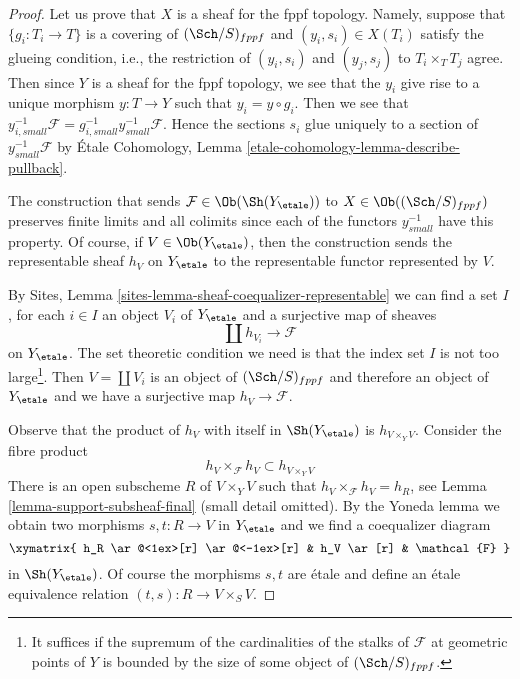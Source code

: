 \begin{proof}
Let us prove that $X$ is a sheaf for the fppf topology. Namely, suppose
that $\{g_i : T_i \to T\}$ is a covering of $(\Sch/S)_{fppf}$ and
$(y_i, s_i) \in X(T_i)$ satisfy the glueing condition, i.e., the
restriction of $(y_i, s_i)$ and $(y_j, s_j)$ to $T_i \times_T T_j$ agree.
Then since $Y$ is a sheaf for the fppf topology, we see that
the $y_i$ give rise to a unique morphism $y : T \to Y$ such that
$y_i = y \circ g_i$. Then we see that
$y_{i, small}^{-1}\mathcal{F} = g_{i, small}^{-1}y_{small}^{-1}\mathcal{F}$.
Hence the sections $s_i$ glue uniquely to a section of
$y_{small}^{-1}\mathcal{F}$ by
\'Etale Cohomology, Lemma \ref{etale-cohomology-lemma-describe-pullback}.

\medskip\noindent
The construction that sends $\mathcal{F} \in \Ob(\Sh(Y_\etale))$
to $X \in \Ob((\Sch/S)_{fppf})$ preserves finite limits and
all colimits since each of the functors $y_{small}^{-1}$ have
this property. Of course, if $V \in \Ob(Y_\etale)$, then
the construction sends the representable sheaf $h_V$ on $Y_\etale$
to the representable functor represented by $V$.

\medskip\noindent
By Sites, Lemma \ref{sites-lemma-sheaf-coequalizer-representable}
we can find a set $I$, for each $i \in I$ an object $V_i$ of $Y_\etale$
and a surjective map of sheaves
$$
\coprod h_{V_i} \longrightarrow \mathcal{F}
$$
on $Y_\etale$. The set theoretic condition we need is that the index
set $I$ is not too large\footnote{It suffices if the supremum of the
cardinalities of the stalks of $\mathcal{F}$ at geometric points of $Y$
is bounded by the size of some object of $(\Sch/S)_{fppf}$.}.
Then $V = \coprod V_i$ is an object of $(\Sch/S)_{fppf}$ and
therefore an object of $Y_\etale$ and we have a surjective map
$h_V \to \mathcal{F}$.

\medskip\noindent
Observe that the product of $h_V$ with itself in $\Sh(Y_\etale)$
is $h_{V \times_Y V}$. Consider the fibre product
$$
h_V \times_\mathcal{F} h_V \subset h_{V \times_Y V}
$$
There is an open subscheme $R$ of $V \times_Y V$ such that
$h_V \times_\mathcal{F} h_V = h_R$, see
Lemma \ref{lemma-support-subsheaf-final} (small detail omitted).
By the Yoneda lemma we obtain two morphisms $s, t : R \to V$ in $Y_\etale$
and we find a coequalizer diagram
$$
\xymatrix{
h_R \ar@<1ex>[r] \ar@<-1ex>[r] &
h_V \ar[r] &
\mathcal{F}
}
$$
in $\Sh(Y_\etale)$. Of course the morphisms $s, t$ are \'etale
and define an \'etale equivalence relation $(t, s) : R \to V \times_S V$.


\end{proof}
